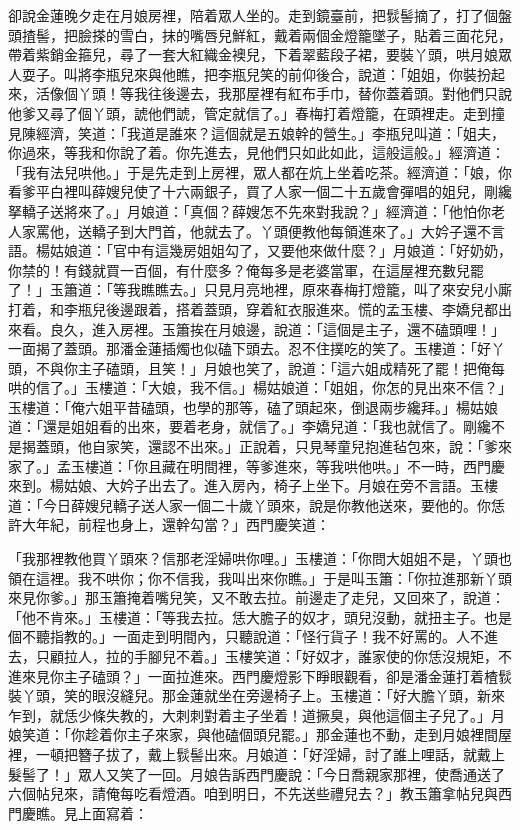 卻說金蓮晚夕走在月娘房裡，陪着眾人坐的。走到鏡臺前，把䯼髻摘了，打了個盤頭揸髻，把臉搽的雪白，抹的嘴唇兒鮮紅，戴着兩個金燈籠墜子，貼着三面花兒，帶着紫銷金箍兒，尋了一套大紅織金襖兒，下着翠藍段子裙，要裝丫頭，哄月娘眾人耍子。叫將李瓶兒來與他瞧，把李瓶兒笑的前仰後合，說道：「姐姐，你裝扮起來，活像個丫頭！等我往後邊去，我那屋裡有紅布手巾，替你蓋着頭。對他們只說他爹又尋了個丫頭，諕他們諕，管定就信了。」春梅打着燈籠，在頭裡走。走到撞見陳經濟，笑道：「我道是誰來？這個就是五娘幹的營生。」李瓶兒叫道：「姐夫，你過來，等我和你說了着。你先進去，見他們只如此如此，這般這般。」經濟道：「我有法兒哄他。」于是先走到上房裡，眾人都在炕上坐着吃茶。經濟道：「娘，你看爹平白裡叫薛嫂兒使了十六兩銀子，買了人家一個二十五歲會彈唱的姐兒，剛纔拏轎子送將來了。」月娘道：「真個？薛嫂怎不先來對我說？」經濟道：「他怕你老人家罵他，送轎子到大門首，他就去了。丫頭便教他每領進來了。」大妗子還不言語。楊姑娘道：「官中有這幾房姐姐勾了，又要他來做什麼？」月娘道：「好奶奶，你禁的！有錢就買一百個，有什麼多？俺每多是老婆當軍，在這屋裡充數兒罷了！」玉簫道：「等我瞧瞧去。」只見月亮地裡，原來春梅打燈籠，叫了來安兒小廝打着，和李瓶兒後邊跟着，搭着蓋頭，穿着紅衣服進來。慌的孟玉樓、李嬌兒都出來看。良久，進入房裡。玉簫挨在月娘邊，說道：「這個是主子，還不磕頭哩！」一面揭了蓋頭。那潘金蓮插燭也似磕下頭去。忍不住撲吃的笑了。玉樓道：「好丫頭，不與你主子磕頭，且笑！」月娘也笑了，說道：「這六姐成精死了罷！把俺每哄的信了。」玉樓道：「大娘，我不信。」楊姑娘道：「姐姐，你怎的見出來不信？」玉樓道：「俺六姐平昔磕頭，也學的那等，磕了頭起來，倒退兩步纔拜。」楊姑娘道：「還是姐姐看的出來，要着老身，就信了。」李嬌兒道：「我也就信了。剛纔不是揭蓋頭，他自家笑，還認不出來。」正說着，只見琴童兒抱進毡包來，說：「爹來家了。」孟玉樓道：「你且藏在明間裡，等爹進來，等我哄他哄。」不一時，西門慶來到。楊姑娘、大妗子出去了。進入房內，椅子上坐下。月娘在旁不言語。玉樓道：「今日薛嫂兒轎子送人家一個二十歲丫頭來，說是你教他送來，要他的。你恁許大年紀，前程也身上，還幹勾當？」西門慶笑道：

「我那裡教他買丫頭來？信那老淫婦哄你哩。」玉樓道：「你問大姐姐不是，丫頭也領在這裡。我不哄你；你不信我，我叫出來你瞧。」于是叫玉簫：「你拉進那新丫頭來見你爹。」那玉簫掩着嘴兒笑，又不敢去拉。前邊走了走兒，又回來了，說道：「他不肯來。」玉樓道：「等我去拉。恁大膽子的奴才，頭兒沒動，就扭主子。也是個不聽指教的。」一面走到明間內，只聽說道：「怪行貨子！我不好罵的。人不進去，只顧拉人，拉的手腳兒不着。」玉樓笑道：「好奴才，誰家使的你恁沒規矩，不進來見你主子磕頭？」一面拉進來。西門慶燈影下睜眼觀看，卻是潘金蓮打着楂䯼裝丫頭，笑的眼沒縫兒。那金蓮就坐在旁邊椅子上。玉樓道：「好大膽丫頭，新來乍到，就恁少條失教的，大刺刺對着主子坐着！道撅臭，與他這個主子兒了。」月娘笑道：「你趁着你主子來家，與他磕個頭兒罷。」那金蓮也不動，走到月娘裡間屋裡，一頓把簪子拔了，戴上䯼髻出來。月娘道：「好淫婦，討了誰上哩話，就戴上髮髻了！」眾人又笑了一回。月娘告訴西門慶說：「今日喬親家那裡，使喬通送了六個帖兒來，請俺每吃看燈酒。咱到明日，不先送些禮兒去？」教玉簫拿帖兒與西門慶瞧。見上面寫着：

